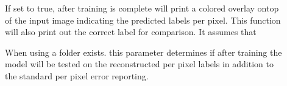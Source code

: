 \begin{description}
\item[] 
\item[]
\item[]
\item[]
\item[]
\item[]
\item[]
\item[]
\item[]
\item[]
\item[]

\item[] If set to true, after training is complete  will print a colored overlay ontop of the input image indicating the predicted labels per pixel. This function will also print out the correct label for comparison. It assumes that 
\item[] When using a folder  exists.  this parameter determines if after training the model will be tested on the reconstructed per pixel labels in addition to the standard per pixel error reporting. 

\end{description}


